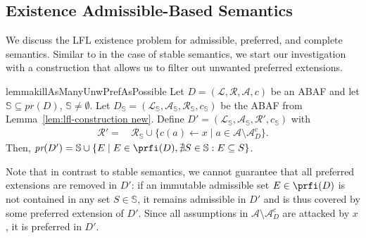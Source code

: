 \documentclass[letterpaper]{article} %
\newcommand{\adm}{\textit{ad}}
\newcommand{\com}{\textit{co}}
\newcommand{\prf}{\textit{pr}}
\newcommand{\lit}{\ensuremath{\mathcal{L}}}
\newcommand{\rules}{\ensuremath{\mathcal{R}}}
\newcommand{\asm}{\ensuremath{\mathcal{A}}}
\newcommand{\atoms}{\mathcal{L}}
\newcommand{\ruleset}{\mathcal{R}}
\newcommand{\assumptions}{\mathcal{A}}
\newcommand{\contra}{c}
\newcommand{\contrary}[1]{c(#1)}
\newcommand{\contraryempty}{c}
\newcommand{\ABAdef}{D=(\atoms,\ruleset,\assumptions,\contra)}
\newcommand{\setS}{\mathbb{S}}
\newcommand{\contraryArgs}[1]{\asm^{c}_{#1}}
\newcommand{\ExLFE}[2]{\textsc{Ex-LFE}_{#1}^{#2}}
\newcommand{\ExLFL}[2]{\textsc{Ex-LFL}_{#1}^{#2}}
\begin{document}
\subsection{Existence Admissible-Based Semantics}\label{sec:adm}
We discuss the LFL existence problem for admissible, preferred, and complete semantics. 
%
Similar to in the case of stable semantics, we start our investigation with a construction that allows us to filter out unwanted preferred extensions.%
\begin{restatable}{lemma}{killAsManyUnwPrefAsPossible}
    \label{lem:kill as many unwanted preferred extensions as possible}
    Let $\ABAdef$ be an ABAF and let $\setS\subseteq \prf(D)$, $\setS\neq \emptyset$. Let $D_\setS=(\lit_\setS,\asm_\setS,\rules_\setS,\contraryempty_\setS)$ be the ABAF from Lemma~\ref{lem:lfl-construction new}.
    Define $D'=(\lit_\setS,\asm_\setS,\rules',\contraryempty_\setS)$ with
    \begin{align*}
    \mathcal{R}' = &\, \mathcal{R}_\setS \cup \{\contrary{a}\gets x\mid a\in \mathcal{A}\setminus \contraryArgs{D}\}.
    \end{align*}
    Then, $\prf(D')= \setS\cup 
    \{ E \mid E\in \prfi(D),\nexists S\in \setS: E\subseteq S\}$.
\end{restatable}
Note that in contrast to stable semantics, we cannot guarantee that all preferred extensions are removed in $D'$: 
if an immutable admissible set $E\in\prfi(D)$ is not contained in any set $S\in \setS$, it remains admissible in $D'$ and is thus covered by some preferred extension of $D'$. Since all assumptions in $\asm\setminus \contraryArgs{D}$ are attacked by $x$, it is preferred in $D'$.
\end{document}
